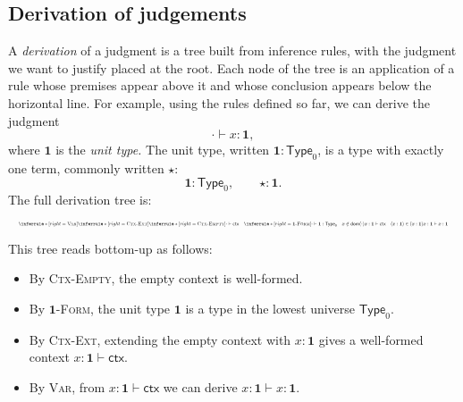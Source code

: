\documentclass{article}
\newcommand{\Type}{\ensuremath{\mathsf{Type}}}
\newcommand{\Nat}{\mathsf{Nat}}
\newcommand{\Bool}{\mathsf{Bool}}
\newcommand{\emptyctx}{\cdot}              %
\newcommand{\ctx}{\mathsf{ctx}}            %
\newcommand{\judg}[3]{#1 \vdash #2 : #3}   %
\newcommand{\dom}{\mathsf{dom}}            %
\newcommand{\rulename}[1]{\textsc{#1}}
\begin{document}


\subsection*{Derivation of judgements}

A \emph{derivation} of a judgment is a tree built from inference rules, with the
judgment we want to justify placed at the root. Each node of the tree is an
application of a rule whose premises appear above it and whose conclusion
appears below the horizontal line. For example, using the rules defined so far, we can derive the judgment
\[
\judg{\emptyctx}{x}{\mathbf{1}},
\]
where $\mathbf{1}$ is the \textit{unit type.} The unit type, written \(\mathbf{1} : \Type_0\), is a type with exactly one term, commonly written \(\star\):
\[
\mathbf{1} : \Type_0, \qquad \star : \mathbf{1}.
\]
The full derivation tree is:

\[
\resizebox{\linewidth}{!}{$
  \inferrule*[right=\rulename{Var}]{
    \inferrule*[right=\rulename{Ctx-Ext}]{
      \inferrule*[right=\rulename{Ctx-Empty}]{ }{ \emptyctx \vdash \ctx }
      \quad
      \inferrule*[right=\rulename{\(\mathbf{1}\)-Form}]{ }{ \judg{\emptyctx}{\mathbf{1}}{\Type_0} }
      \quad
      x \notin \dom(\emptyctx)
    }{
      x:\mathbf{1} \vdash \ctx
    }
    \quad
    (x:\mathbf{1}) \in (x:\mathbf{1})
  }{
    \judg{x:\mathbf{1}}{x}{\mathbf{1}}
  }
$}
\]

This tree reads bottom-up as follows:
\begin{itemize}
  \item By \rulename{Ctx-Empty}, the empty context is well-formed.
  \item By \rulename{\(\mathbf{1}\)-Form}, the unit type \(\mathbf{1}\) is a type in the lowest universe \(\Type_0\).
  \item By \rulename{Ctx-Ext}, extending the empty context with \(x:\mathbf{1}\) gives a well-formed context \(x:\mathbf{1}\vdash \ctx\).
  \item By \rulename{Var}, from \(x:\mathbf{1}\vdash \ctx\) we can derive \(\judg{x:\mathbf{1}}{x}{\mathbf{1}}\).
\end{itemize}
\end{document}

